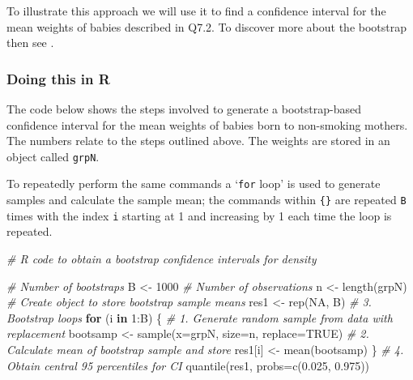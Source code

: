 \documentclass[
  oneside]{krantz}
\newenvironment{Shaded}{\begin{snugshade}}{\end{snugshade}}
\newcommand{\AttributeTok}[1]{\textcolor[rgb]{0.77,0.63,0.00}{#1}}
\newcommand{\CommentTok}[1]{\textcolor[rgb]{0.56,0.35,0.01}{\textit{#1}}}
\newcommand{\ConstantTok}[1]{\textcolor[rgb]{0.00,0.00,0.00}{#1}}
\newcommand{\ControlFlowTok}[1]{\textcolor[rgb]{0.13,0.29,0.53}{\textbf{#1}}}
\newcommand{\DecValTok}[1]{\textcolor[rgb]{0.00,0.00,0.81}{#1}}
\newcommand{\FloatTok}[1]{\textcolor[rgb]{0.00,0.00,0.81}{#1}}
\newcommand{\FunctionTok}[1]{\textcolor[rgb]{0.00,0.00,0.00}{#1}}
\newcommand{\NormalTok}[1]{#1}
\newcommand{\OtherTok}[1]{\textcolor[rgb]{0.56,0.35,0.01}{#1}}
\newcommand{\SpecialCharTok}[1]{\textcolor[rgb]{0.00,0.00,0.00}{#1}}
\begin{document}
To illustrate this approach we will use it to find a confidence interval for the mean weights of babies described in Q7.2. To discover more about the bootstrap then see \citep{Davison1997}.

\hypertarget{doing-this-in-r-10}{%
\subsubsection{Doing this in R}\label{doing-this-in-r-10}}

The code below shows the steps involved to generate a bootstrap-based confidence interval for the mean weights of babies born to non-smoking mothers. The numbers relate to the steps outlined above. The weights are stored in an object called \texttt{grpN}.

To repeatedly perform the same commands a `\texttt{for} loop' is used to generate samples and calculate the sample mean; the commands within \texttt{\{\}} are repeated \texttt{B} times with the index \texttt{i} starting at 1 and increasing by 1 each time the loop is repeated.

\begin{Shaded}
\begin{Highlighting}[]
\CommentTok{\# R code to obtain a bootstrap confidence intervals for density}

\CommentTok{\# Number of bootstraps}
\NormalTok{B }\OtherTok{\textless{}{-}} \DecValTok{1000}
\CommentTok{\# Number of observations}
\NormalTok{n }\OtherTok{\textless{}{-}} \FunctionTok{length}\NormalTok{(grpN)}
\CommentTok{\# Create object to store bootstrap sample means}
\NormalTok{res1 }\OtherTok{\textless{}{-}} \FunctionTok{rep}\NormalTok{(}\ConstantTok{NA}\NormalTok{, B)}
\CommentTok{\# 3. Bootstrap loops}
\ControlFlowTok{for}\NormalTok{ (i }\ControlFlowTok{in} \DecValTok{1}\SpecialCharTok{:}\NormalTok{B) \{}
  \CommentTok{\# 1. Generate random sample from data with replacement}
\NormalTok{  bootsamp }\OtherTok{\textless{}{-}} \FunctionTok{sample}\NormalTok{(}\AttributeTok{x=}\NormalTok{grpN, }\AttributeTok{size=}\NormalTok{n, }\AttributeTok{replace=}\ConstantTok{TRUE}\NormalTok{)}
  \CommentTok{\# 2. Calculate mean of bootstrap sample and store}
\NormalTok{  res1[i] }\OtherTok{\textless{}{-}} \FunctionTok{mean}\NormalTok{(bootsamp) }
\NormalTok{\}}
\CommentTok{\# 4. Obtain central 95 percentiles for CI}
\FunctionTok{quantile}\NormalTok{(res1, }\AttributeTok{probs=}\FunctionTok{c}\NormalTok{(}\FloatTok{0.025}\NormalTok{, }\FloatTok{0.975}\NormalTok{))}
\end{Highlighting}
\end{Shaded}
\end{document}
